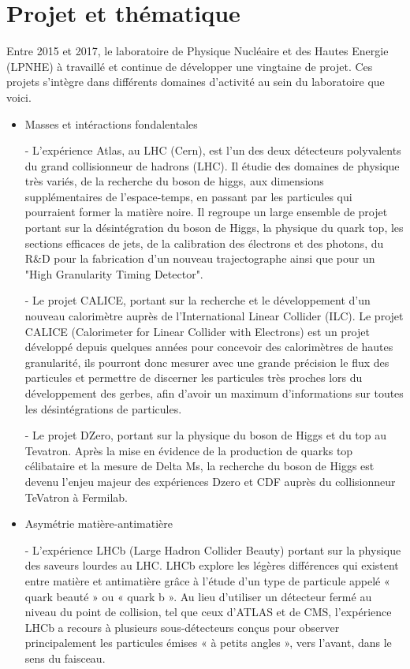 \documentclass[french,a4paper,12pt]{report}
\begin{document}
  \newpage
  
  \section{Projet et thématique}
  
		Entre 2015 et 2017, le laboratoire de Physique Nucléaire et des Hautes Energie (LPNHE) à travaillé et continue de développer une vingtaine de projet. Ces projets s'intègre dans différents domaines d'activité au sein du laboratoire que voici.
  	
  \begin{itemize}
		\item Masses et intéractions fondalentales
		
			- L'expérience Atlas, au LHC (Cern), est l'un des deux détecteurs polyvalents du grand collisionneur de hadrons (LHC). Il étudie des domaines de physique très variés, de la recherche du boson de higgs, aux dimensions supplémentaires de l'espace-temps, en passant par les particules qui pourraient former la matière noire. Il regroupe un large ensemble de projet portant sur la désintégration du boson de Higgs, la physique du quark top, les sections efficaces de jets, de la calibration des électrons et des photons, du R\&D pour la fabrication d'un nouveau trajectographe ainsi que pour un "High Granularity Timing Detector".
			
			- Le projet CALICE, portant sur la recherche et le développement d'un nouveau calorimètre auprès de l'International Linear Collider (ILC). Le projet CALICE (Calorimeter for Linear Collider with Electrons) est un projet développé depuis quelques années pour concevoir des calorimètres de hautes granularité, ils pourront donc mesurer avec une grande précision le flux des particules et permettre de discerner les particules très proches lors du développement des gerbes, afin d'avoir un maximum d'informations sur toutes les désintégrations de particules.			
			
			- Le projet DZero, portant sur la physique du boson de Higgs et du top au Tevatron. Après la mise en évidence de la production de quarks top célibataire et la mesure de Delta Ms, la recherche du boson de Higgs est devenu l'enjeu majeur des expériences Dzero et CDF auprès du collisionneur TeVatron à Fermilab. 
			
		\item Asymétrie matière-antimatière
		
			- L'expérience LHCb (Large Hadron Collider Beauty) portant sur la physique des saveurs lourdes au LHC.
				LHCb explore les légères différences qui existent entre matière et antimatière grâce à l’étude d’un type de particule appelé « quark beauté » ou « quark b ». Au lieu d’utiliser un détecteur fermé au niveau du point de collision, tel que ceux d’ATLAS et de CMS, l’expérience LHCb a recours à plusieurs sous-détecteurs conçus pour observer principalement les particules émises « à petits angles », vers l’avant, dans le sens du faisceau.
			

\end{itemize}
\end{document}

